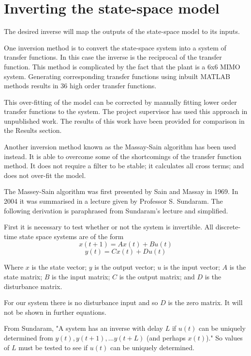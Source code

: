 \documentclass{report}
\begin{document}
\section{Inverting the state-space model}
\label{SSInverse}
The desired inverse will map the outputs of the state-space model to its inputs.

One inversion method is to convert the state-space system into a system of transfer functions. In this case the inverse is the reciprocal of the transfer function. This method is complicated by the fact that the plant is a 6x6 MIMO system. Generating corresponding transfer functions using inbuilt MATLAB methods results in 36 high order transfer functions.

This over-fitting of the model can be corrected by manually fitting lower order transfer functions to the system. The project supervisor has used this approach in unpublished work\cite{andyModelErrors}. The results of this work have been provided for comparison in the Results section.

Another inversion method known as the Massay-Sain algorithm has been used instead. It is able to overcome some of the shortcomings of the transfer function method. It does not require a filter to be stable; it calculates all cross terms; and does not over-fit the model.

The Massey-Sain algorithm was first presented by Sain and Massay in 1969\cite{OGMassaySain}. In 2004 it was summarised in a lecture given by Professor S. Sundaram\cite{Sundaram}. The following derivation is paraphrased from Sundaram's lecture and simplified.

First it is necessary to test whether or not the system is invertible. All discrete-time state space systems are of the form
\begin{equation}
\label{definition1}
	x(t+1)=Ax(t)+Bu(t)
\end{equation}
\begin{equation}
\label{definition2}
	y(t)=Cx(t)+Du(t)
\end{equation}

Where $x$ is the state vector; $y$ is the output vector; $u$ is the input vector; $A$ is the state matrix; $B$ is the input matrix; $C$ is the output matrix; and $D$ is the disturbance matrix.

For our system there is no disturbance input and so $D$ is the zero matrix. It will not be shown in further equations.

From Sundaram,
"A system has an inverse with delay $L$ if $u(t)$ can be uniquely determined from $y(t),y(t+1),…y(t+L)$  (and perhaps $x(t)$)."\cite{Sundaram} So values of $L$ must be tested to see if $u(t)$ can be uniquely determined.
\end{document}
